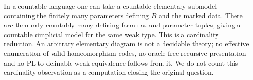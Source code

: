 In a countable language one can take a countable elementary submodel
containing the finitely many parameters defining $B$ and the marked
data. There are then only countably many defining formulas and
parameter tuples, giving a countable simplicial model for the same
weak type. This is a cardinality reduction. An arbitrary elementary
diagram is not a decidable theory; no effective enumeration of valid
homeomorphism codes, no oracle-free recursive presentation and no
PL-to-definable weak equivalence follows from it. We do not count
this cardinality observation as a computation closing the original
question.
